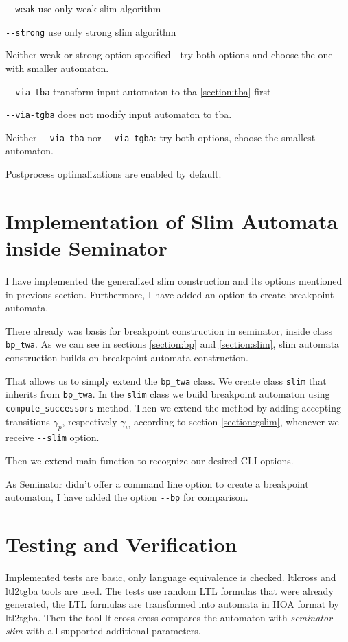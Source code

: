 \documentclass[
	digital,
nolof, nolot
]{fithesis3}
\begin{document}
		\texttt{-{}-weak} use only weak slim algorithm
		
		\texttt{-{}-strong} use only strong slim algorithm
		
		Neither weak or strong option specified - try both options  and choose the one with smaller automaton.
		
		\texttt{-{}-via-tba} transform input automaton to tba \ref{section:tba} first
		
		\texttt{-{}-via-tgba} does not modify input automaton to tba.
		
		Neither \texttt{-{}-via-tba} nor \texttt{-{}-via-tgba}: try both options, choose the smallest automaton.
		
		Postprocess optimalizations are enabled by default.
		
		
	\section{Implementation of Slim Automata inside Seminator}
	I have implemented the generalized slim construction and its options mentioned in previous section. Furthermore, I have added an option to create breakpoint automata.
	
	There already was basis for breakpoint construction in seminator, inside class \texttt{bp\_twa}.
	As we can see in sections \ref{section:bp} and \ref{section:slim}, slim automata construction builds on breakpoint automata construction.
	
	That allows us to simply extend the \texttt{bp\_twa} class.
	We create class \texttt{slim} that inherits from \texttt{bp\_twa}.
	In the \texttt{slim} class we build breakpoint automaton using \texttt{compute\_successors} method.
	Then we extend the method by adding accepting transitions $\gamma_p$, respectively $\gamma_w$ according to section \ref{section:gslim}, whenever we receive \texttt{-{}-slim} option.
	
	Then we extend main function to recognize our desired CLI options.
	
	As Seminator didn't offer a command line option to create a breakpoint automaton, I have added the option \texttt{-{}-bp} for comparison.
	
	
	
	\section{Testing and Verification}
	Implemented tests are basic, only language equivalence is checked.
	ltlcross and ltl2tgba tools are used. The tests use random LTL formulas that were already generated, the LTL formulas are transformed into automata in HOA format by ltl2tgba.
	Then the tool ltlcross cross-compares the automaton with \emph{seminator -{}-slim} with all supported additional parameters.
	
\end{document}

